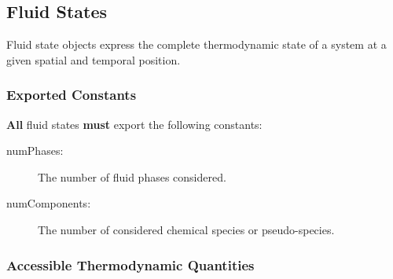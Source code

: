 \subsection{Fluid States}

Fluid state objects express the complete thermodynamic state of a
system at a given spatial and temporal position.

\subsubsection{Exported Constants}

{\bf All} fluid states {\bf must} export the following constants:
\begin{description}
\item[numPhases:] The number of fluid phases considered.
\item[numComponents:] The number of considered chemical
  species or pseudo-species.
\end{description}

\subsubsection{Accessible Thermodynamic Quantities}

